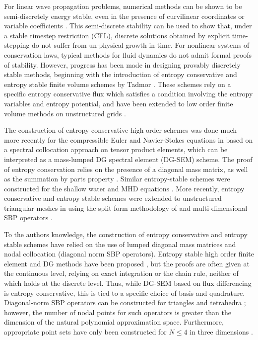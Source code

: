 \documentclass[preprint,10pt]{article}
\theoremstyle{definition}
\theoremstyle{lemma}
\theoremstyle{theorem}
\theoremstyle{assumption}
\begin{document}
For linear wave propagation problems, numerical methods can be shown to be semi-discretely energy stable, even in the presence of curvilinear coordinates or variable coefficients \cite{warburton2013low, chan2016weight1, chan2016weight2, chan2017weight}.  This semi-discrete stability can be used to show that, under a stable timestep restriction (CFL), discrete solutions obtained by explicit time-stepping do not suffer from un-physical growth in time.  For nonlinear systems of conservation laws, typical methods for fluid dynamics do not admit formal proofs of stability.  However, progress has been made in designing provably discretely stable methods, beginning with the introduction of entropy conservative and entropy stable finite volume schemes by Tadmor \cite{tadmor1987numerical, tadmor2003entropy}.   These schemes rely on a specific entropy conservative flux which satisfies a condition involving the entropy variables and entropy potential, and have been extended to low order finite volume methods on unstructured grids \cite{ray2016entropy}.  

The construction of entropy conservative high order schemes was done much more recently for the compressible Euler and Navier-Stokes equations in \cite{fisher2013high, carpenter2014entropy} based on a spectral collocation approach on tensor product elements, which can be interpreted as a mass-lumped DG spectral element (DG-SEM) scheme.  The proof of entropy conservation relies on the presence of a diagonal mass matrix, as well as the summation by parts property \cite{gassner2013skew}.  Similar entropy-stable schemes were constructed for the shallow water and MHD equations \cite{gassner2016well, wintermeyer2017entropy,winters2017uniquely}.  More recently, entropy conservative and entropy stable schemes were extended to unstructured triangular meshes in \cite{chen2017entropy} using the split-form methodology of \cite{gassner2016split} and multi-dimensional SBP operators \cite{hicken2016multidimensional}.  

To the authors knowledge, the construction of entropy conservative and entropy stable schemes have relied on the use of lumped diagonal mass matrices and nodal collocation (diagonal norm SBP operators).  Entropy stable high order finite element and DG methods have been proposed \cite{hughes1986new}, but the proofs are often given at the continuous level, relying on exact integration or the chain rule, neither of which holds at the discrete level.  Thus, while DG-SEM based on flux differencing is entropy conservative, this is tied to a specific choice of basis and quadrature.  Diagonal-norm SBP operators can be constructed for triangles and tetrahedra \cite{chin1999higher,  hicken2016multidimensional, chen2017entropy}; however, the number of nodal points for such operators is greater than the dimension of the natural polynomial approximation space.  Furthermore, appropriate point sets have only been constructed for $N \leq 4$ in three dimensions \cite{zhebel2014comparison}.  
\end{document}
